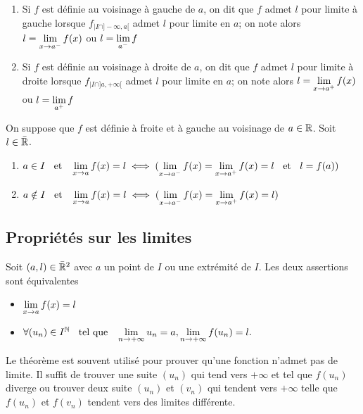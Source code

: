 \begin{dfn} 
\begin{enumerate}
    \item Si $f$ est définie au voisinage à gauche de $a$, on dit que
    $f$ admet $l$ pour limite à gauche lorsque $f_{|I\cap ]-\infty, a[}$
    admet $l$ pour limite en $a$; on note alors
    $l = \lim\limits_{x \to a^-} f(x)$ ou $l = \lim\limits_{a^-} f$
    \item Si $f$ est définie au voisinage à droite de $a$, on dit que
    $f$ admet $l$ pour limite à droite lorsque $f_{|I\cap ]a, +\infty[}$
    admet $l$ pour limite en $a$; on note alors
    $l = \lim\limits_{x \to a^+} f(x)$ ou $l = \lim\limits_{a^+} f$
\end{enumerate}
\end{dfn}

\begin{prp} 
On suppose que $f$ est définie à froite et à gauche au voisinage de
$a \in \mathbb{R}$. Soit $l \in \bar{\mathbb{R}}$.
\begin{enumerate}
    \item $a \in I \;\;\text{ et }\;\; \lim\limits_{x \to a} f(x) = l \iff
    (\lim\limits_{x \to a^-} f(x) = \lim\limits_{x \to a^+} f(x) = l \;\;\text{ et }\;\; l = f(a))$
    \item $a \notin I \;\;\text{ et }\;\; \lim\limits_{x \to a} f(x) = l \iff
    (\lim\limits_{x \to a^-} f(x) = \lim\limits_{x \to a^+} f(x) = l)$
\end{enumerate}
\end{prp}

\subsection{Propriétés sur les limites}

\begin{thm}
Soit $(a, l) \in \bar{\mathbb{R}}^2$ avec $a$ un point de $I$ ou une extrémité
de $I$. Les deux assertions sont équivalentes
\begin{itemize}
    \item $\lim\limits_{x \to a} f(x) = l$ 
    \item $\forall (u_n) \in I^{\mathbb{N}} \;\;\text{ tel que }\;\; \lim\limits_{n \to +\infty} u_n = a,
    \lim\limits_{n \to +\infty} f(u_n) = l.$
\end{itemize}
\end{thm}

\begin{rem}
Le théorème est souvent utilisé pour prouver qu'une fonction n'admet pas
de limite.
Il suffit de trouver une suite $(u_n)$ qui tend vers $+\infty$ et tel
que $f(u_n)$ diverge ou trouver deux suite $(u_n)$ et $(v_n)$
qui tendent vers $+\infty$ telle que $f(u_n)$ et $f(v_n)$ tendent vers des
limites différente.
\end{rem}
 

